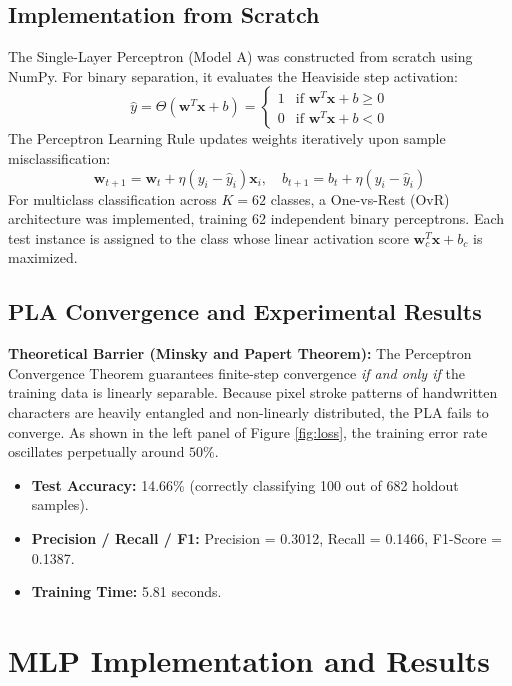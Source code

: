 \documentclass[12pt,a4paper]{article}
\begin{document}
\subsection{Implementation from Scratch}
The Single-Layer Perceptron (Model A) was constructed from scratch using NumPy. For binary separation, it evaluates the Heaviside step activation:
\begin{equation}
\hat{y} = \Theta(\mathbf{w}^T \mathbf{x} + b) = \begin{cases} 1 & \text{if } \mathbf{w}^T \mathbf{x} + b \ge 0 \\ 0 & \text{if } \mathbf{w}^T \mathbf{x} + b < 0 \end{cases}
\end{equation}
The Perceptron Learning Rule updates weights iteratively upon sample misclassification:
\begin{equation}
\mathbf{w}_{t+1} = \mathbf{w}_t + \eta (y_i - \hat{y}_i) \mathbf{x}_i, \quad b_{t+1} = b_t + \eta (y_i - \hat{y}_i)
\end{equation}
For multiclass classification across $K=62$ classes, a One-vs-Rest (OvR) architecture was implemented, training 62 independent binary perceptrons. Each test instance is assigned to the class whose linear activation score $\mathbf{w}_c^T \mathbf{x} + b_c$ is maximized.

\subsection{PLA Convergence and Experimental Results}
\textbf{Theoretical Barrier (Minsky and Papert Theorem):} The Perceptron Convergence Theorem guarantees finite-step convergence \emph{if and only if} the training data is linearly separable. Because pixel stroke patterns of handwritten characters are heavily entangled and non-linearly distributed, the PLA fails to converge. 
As shown in the left panel of Figure \ref{fig:loss}, the training error rate oscillates perpetually around $50\%$.
\begin{itemize}
\item \textbf{Test Accuracy:} 14.66\% (correctly classifying 100 out of 682 holdout samples).
\item \textbf{Precision / Recall / F1:} Precision = 0.3012, Recall = 0.1466, F1-Score = 0.1387.
\item \textbf{Training Time:} 5.81 seconds.
\end{itemize}

\section{MLP Implementation and Results}
\end{document}
